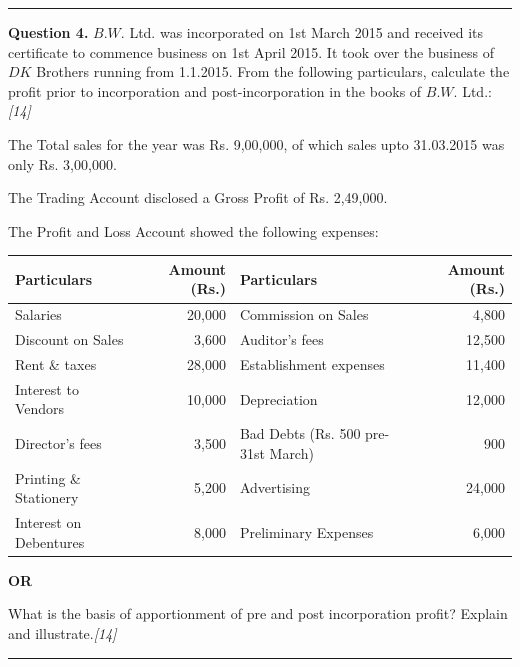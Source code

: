 \documentclass[11pt,a4paper]{article}
\newcommand{\pts}[1]{\hfill   \textit{[#1]}}
\begin{document}
\medskip\rule{\linewidth}{0.2pt}




\noindent   \textbf{Question 4.}
$B.W.$ Ltd. was incorporated on 1st March 2015 and received its certificate to commence business on 1st April 2015. It took over the business of $DK$ Brothers running from 1.1.2015. From the following particulars, calculate the profit prior to incorporation and post-incorporation in the books of $B.W.$ Ltd.:\pts{14}

\begin{parts}
  \item The Total sales for the year was Rs. 9,00,000, of which sales upto 31.03.2015 was only Rs. 3,00,000.
  \item The Trading Account disclosed a Gross Profit of Rs. 2,49,000.
  \item The Profit and Loss Account showed the following expenses:
  
\begin{center}
    \small
    
\begin{tabular}{|l|r||l|r|}
      \hline
   \textbf{Particulars} &   \textbf{Amount (Rs.)} &   \textbf{Particulars} &   \textbf{Amount (Rs.)} \\
      \hline
      Salaries & 20,000 & Commission on Sales & 4,800 \\
      Discount on Sales & 3,600 & Auditor's fees & 12,500 \\
      Rent \& taxes & 28,000 & Establishment expenses & 11,400 \\
      Interest to Vendors & 10,000 & Depreciation & 12,000 \\
      Director's fees & 3,500 & Bad Debts (Rs. 500 pre-31st March) & 900 \\
      Printing \& Stationery & 5,200 & Advertising & 24,000 \\
      Interest on Debentures & 8,000 & Preliminary Expenses & 6,000 \\
      \hline
    \end{tabular}
  \end{center}
\end{parts}

\centerline{   \textbf{OR}}

What is the basis of apportionment of pre and post incorporation profit? Explain and illustrate.\pts{14}

\medskip\rule{\linewidth}{0.2pt}


\newpage
\end{document}
